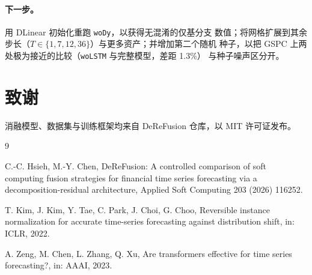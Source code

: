 \documentclass[11pt, a4paper]{ctexart}
\begin{document}
\paragraph{下一步。} 用 DLinear 初始化重跑 \texttt{woDy}，以获得无混淆的仅基分支
数值；将网格扩展到其余步长（$T\in\{1,7,12,36\}$）与更多资产；并增加第二个随机
种子，以把 GSPC 上两处极为接近的比较（\texttt{woLSTM} 与完整模型，差距 1.3\%）
与种子噪声区分开。

\section*{致谢}

消融模型、数据集与训练框架均来自 DeReFusion 仓库，以 MIT 许可证发布。

\begin{thebibliography}{9}

C.-C. Hsieh, M.-Y. Chen,
DeReFusion: A controlled comparison of soft computing fusion strategies for
financial time series forecasting via a decomposition-residual architecture,
Applied Soft Computing 203 (2026) 116252.

T. Kim, J. Kim, Y. Tae, C. Park, J. Choi, G. Choo,
Reversible instance normalization for accurate time-series forecasting
against distribution shift, in: ICLR, 2022.

A. Zeng, M. Chen, L. Zhang, Q. Xu,
Are transformers effective for time series forecasting?, in: AAAI, 2023.

\end{thebibliography}
\end{document}

